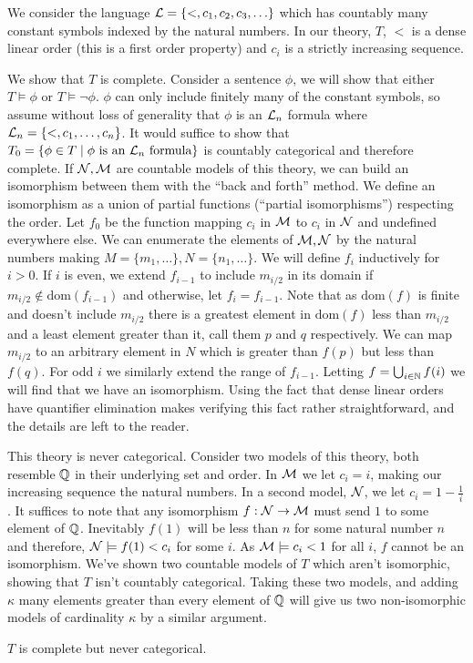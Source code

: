 \begin{example}\label{example_categoricity_sequence}
We consider the language \(\mathcal{L} = \{<, c_1, c_2, c_3, \ldots\}\) which has countably many constant symbols indexed by the natural numbers. 
In our theory, \(T\), \(<\) is a dense linear order (this is a first order property) and \(c_i\) is a strictly increasing sequence. 

We show that \(T\) is complete.
Consider a sentence \(\phi\), we will show that either \(T \models \phi\) or \(T \models \neg \phi\). 
\(\phi\) can only include finitely many of the constant symbols, so assume without loss of generality that \(\phi\) is an \(\mathcal{L}_n\) formula where \(\mathcal{L}_n = \{<, c_1, \ldots, c_n\}\).
It would suffice to show that \(T_0 = \{\phi \in T \mid \phi \text{ is an } \mathcal{L}_n \text{ formula}\}\) is countably categorical and therefore complete. 
If \(\mathcal{N}, \mathcal{M}\) are countable models of this theory, we can build an isomorphism between them with the ``back and forth'' method. 
We define an isomorphism as a union of partial functions (``partial isomorphisms'') respecting the order. 
Let \(f_0\) be the function mapping \(c_i\) in \(\mathcal{M}\) to \(c_i\) in \(\mathcal{N}\) and undefined everywhere else. 
We can enumerate the elements of \(\mathcal{M}, \mathcal{N}\) by the natural numbers making \(M = \{m_1, \ldots\}, N = \{n_1, \ldots\}\). 
We will define \(f_i\) inductively for \(i > 0\). 
If \(i\) is even, we extend \(f_{i-1}\) to include \(m_{i/2}\) in its domain if \(m_{i/2} \notin \text{dom}(f_{i-1})\) and otherwise, let \(f_i = f_{i-1}\).
Note that as \(\text{dom}(f)\) is finite and doesn't include \(m_{i/2}\) there is a greatest element in \(\text{dom}(f)\) less than \(m_{i/2}\) and a least element greater than it, call them \(p\) and \(q\) respectively.
We can map \(m_{i/2}\) to an arbitrary element in \(N\) which is greater than \(f(p)\) but less than \(f(q)\). 
For odd \(i\) we similarly extend the range of \(f_{i-1}\). 
Letting \(f = \bigcup_{i \in \mathbb{N}}f(i)\) we will find that we have an isomorphism. 
Using the fact that dense linear orders have quantifier elimination %
makes verifying this fact rather straightforward, and the details are left to the reader.
 
This theory is never categorical.
Consider two models of this theory, both resemble \(\mathbb{Q}\) in their underlying set and order.
In \(\mathcal{M}\) we let \(c_i = i\), making our increasing sequence the natural numbers. 
In a second model, \(\mathcal{N}\), we let \(c_i = 1 - \frac{1}{i}\).
It suffices to note that any isomorphism \(f: \mathcal{N} \to \mathcal{M}\) must send \(1\) to some element of \(\mathbb{Q}\).
Inevitably \(f(1)\) will be less than \(n\) for some natural number \(n\) and therefore, \(\mathcal{N} \models f(1) < c_i\) for some \(i\).
As \(\mathcal{M} \models c_i < 1\) for all \(i\), \(f\) cannot be an isomorphism. 
We've shown two countable models of \(T\) which aren't isomorphic, showing that \(T\) isn't countably categorical. 
Taking these two models, and adding \(\kappa\) many elements greater than every element of \(\mathbb{Q}\) will give us two non-isomorphic models of cardinality \(\kappa\) by a similar argument. 

\(T\) is complete but never categorical. 
\end{example}

